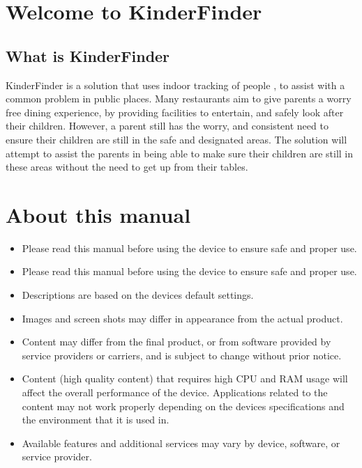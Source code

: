 \documentclass{article}
\begin{document}
\tableofcontents
\newpage


\section{Welcome to KinderFinder}
\subsection{What is KinderFinder}
KinderFinder is a  solution that uses indoor tracking of people ,  to assist with a common 
problem  in  public  places.  Many  restaurants  aim  to  give  parents  a  worry  free  dining 
experience,  by providing facilities to entertain,  and safely look after their children. However, 
a parent still has the worry, and consistent need  to  ensure their children are still in the safe 
and designated areas.  The solution will attempt to assist the parents in being able to make 
sure their children are still in these areas without the need to get up from their tables.


\newpage
\section{About this manual}

\begin{itemize}
\item Please read this manual before using the device to ensure safe and proper use.
\item  	Please read this manual before using the device to ensure safe and proper use.
\item	Descriptions are based on the devices default settings.
\item 	Images and screen shots may differ in appearance from the actual product.
\item 	Content may differ from the final product, or from software provided by service providers 
or carriers, and is subject to change without prior notice.
\item	Content (high quality content) that requires high CPU and RAM usage will affect the 
overall performance of the device. Applications related to the content may not work 
properly depending on the devices specifications and the environment that it is used in.
\item	Available features and additional services may vary by device, software, or service 
provider.

\end{itemize}
\end{document}

